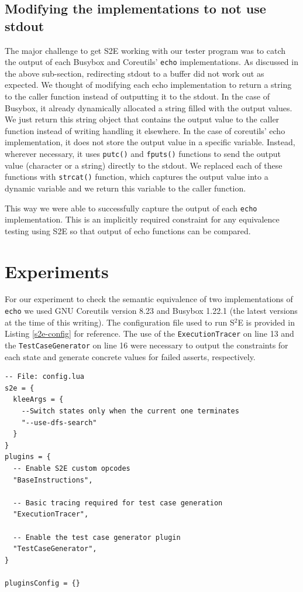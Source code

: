 \documentclass[conference]{IEEEtran}
\begin{document}
\subsection{Modifying the implementations to not use stdout}

The major challenge to get S2E working with our tester program was to catch the output of each Busybox and Coreutils' {\tt echo} implementations. As discussed in the above sub-section, redirecting stdout to a buffer did not work out as expected. We thought of modifying each echo implementation to return a string to the caller function instead of outputting it to the stdout. In the case of Busybox, it already dynamically allocated a string filled with the output values. We just return this string object that contains the output value to the caller function instead of writing handling it elsewhere. In the case of coreutils' echo implementation, it does not store the output value in a specific variable. Instead, wherever necessary, it uses {\tt putc()} and {\tt fputs()} functions to send the output value (character or a string) directly to the stdout. We replaced each of these functions with {\tt strcat()} function, which captures the output value into a dynamic variable and we return this variable to the caller function. 

This way we were able to successfully capture the output of each {\tt echo} implementation. This is an implicitly required constraint for any equivalence testing using S2E so that output of echo functions can be compared.  


\section{Experiments}

For our experiment to check the semantic equivalence of two implementations of {\tt echo} we used GNU Coreutils version 8.23 and Busybox 1.22.1 (the latest versions at the time of this writing). The configuration file used to run S$^2$E is provided in Listing \ref{s2e-config} for reference. The use of the {\tt ExecutionTracer} on line 13 and the {\tt TestCaseGenerator} on line 16 were necessary to output the constraints for each state and generate concrete values for failed asserts, respectively. \\

\begin{lstlisting}[style=Lua, label=s2e-config, abovecaptionskip=2ex, captionpos=b, caption={S$^2$E configuration file used for experiment}]
-- File: config.lua
s2e = {
  kleeArgs = {
    --Switch states only when the current one terminates
    "--use-dfs-search"
  }
}
plugins = {
  -- Enable S2E custom opcodes
  "BaseInstructions",

  -- Basic tracing required for test case generation
  "ExecutionTracer",

  -- Enable the test case generator plugin
  "TestCaseGenerator",
}

pluginsConfig = {}
\end{lstlisting}
\end{document}
